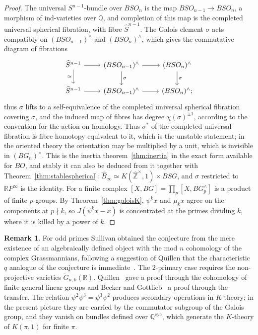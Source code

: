 \documentclass[11pt]{amsart}
\theoremstyle{plain}
\theoremstyle{definition}
\newtheorem{remark}[theorem]{Remark}
\numberwithin{equation}{section}
\newcommand{\Q}{\mathbb{Q}}
\newcommand{\R}{\mathbb{R}}
\newcommand{\Zhat}{\widehat{\mathbb{Z}}}
\newcommand{\RP}{\mathbb{R}P}
\newcommand{\units}{^{\times}}
\begin{document}
\begin{proof}
The universal $S^{n-1}$-bundle over $BSO_n$ is the map $BSO_{n-1}\to BSO_n$, a morphism of ind-varieties over $\Q$, and completion of this map is the completed universal spherical fibration, with fibre $\widehat S^{n-1}$.
The Galois element $\sigma$ acts compatibly on $(BSO_{n-1})^\wedge$ and $(BSO_n)^\wedge$, which gives the commutative diagram of fibrations
\[
\begin{tikzcd}
\widehat S^{n-1}\arrow[r]\arrow[d,"\simeq"'] & (BSO_{n-1})^\wedge\arrow[r]\arrow[d,"\sigma"] & (BSO_n)^\wedge\arrow[d,"\sigma"]\\
\widehat S^{n-1}\arrow[r] & (BSO_{n-1})^\wedge\arrow[r] & (BSO_n)^\wedge ;
\end{tikzcd}
\]
thus $\sigma$ lifts to a self-equivalence of the completed universal spherical fibration covering $\sigma$, and the induced map of fibres has degree $\chi(\sigma)^{\pm1}$, according to the convention for the action on homology.
Thus $\sigma^*$ of the completed universal fibration is fibre homotopy equivalent to it, which is the unstable statement; in the oriented theory the orientation may be multiplied by a unit, which is invisible in $(BG_n)^\wedge$.
This is the inertia theorem~\ref{thm:inertia} in the exact form available for $BO$, and stably it can also be deduced from it together with Theorem~\ref{thm:stablespherical}: $\widehat B_\infty\simeq K(\Zhat\units,1)\times BSG$, and $\sigma$ restricted to $\RP^\infty$ is the identity.
For a finite complex $[X,BG]=\prod_p[X,BG^\wedge_p]$ is a product of finite $p$-groups.
By Theorem~\ref{thm:galoisK}, $\psi^kx$ and $\mu_kx$ agree on the components at $p\nmid k$, so $J(\psi^kx-x)$ is concentrated at the primes dividing $k$, where it is killed by a power of $k$.
\end{proof}

\begin{remark}
For odd primes Sullivan obtained the conjecture from the mere existence of an algebraically defined object with the mod $n$ cohomology of the complex Grassmannians, following a suggestion of Quillen that the characteristic $q$ analogue of the conjecture is immediate~\cite{QuillenRemarks}.
The $2$-primary case requires the non-projective varieties $\widetilde G_{n,k}(\R)$.
Quillen~\cite{QuillenAdams} gave a proof through the cohomology of finite general linear groups and Becker and Gottlieb~\cite{BeckerGottlieb} a proof through the transfer.
The relation $\psi^2\psi^3=\psi^3\psi^2$ produces secondary operations in $K$-theory; in the present picture they are carried by the commutator subgroup of the Galois group, and they vanish on bundles defined over $\Q^{\mathrm{cyc}}$, which generate the $K$-theory of $K(\pi,1)$ for finite $\pi$.
\end{remark}
\end{document}
